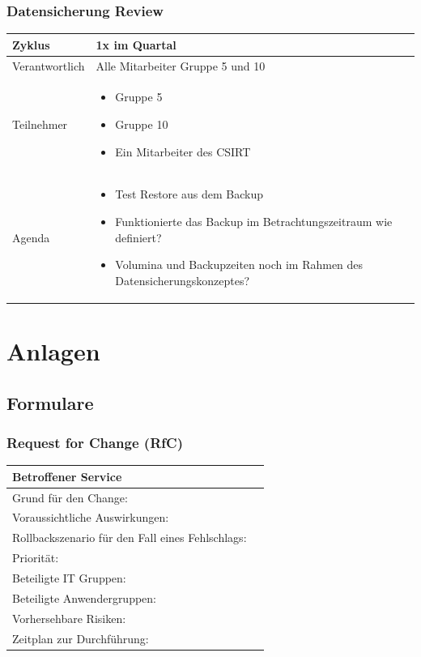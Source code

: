\documentclass[]{article}
\begin{document}
\subsubsection{Datensicherung Review}\label{datensicherung-review}

\begin{longtable}{lp{8cm}}
\toprule
Zyklus & 1x im Quartal\tabularnewline
\midrule
\endhead
Verantwortlich & Alle Mitarbeiter Gruppe 5 und 10\tabularnewline
Teilnehmer & \begin{itemize}
\item
  Gruppe 5
\item
  Gruppe 10
\item
  Ein Mitarbeiter des CSIRT
\end{itemize}\tabularnewline
Agenda & \begin{itemize}
\item
  Test Restore aus dem Backup
\item
  Funktionierte das Backup im Betrachtungszeitraum wie definiert?
\item
  Volumina und Backupzeiten noch im Rahmen des Datensicherungskonzeptes?
\end{itemize}\tabularnewline
\bottomrule
\end{longtable}

\protect\hypertarget{ux5fToc457467708}{}{}
\newpage
\section{Anlagen}\label{anlagen}

\subsection{Formulare}\label{formulare}

\subsubsection{Request for Change (RfC)}\label{request-for-change-rfc}

\begin{longtable}{p{5.5cm}p{7.5cm}}
\toprule
Betroffener Service &\tabularnewline
\midrule
Grund für den Change: & \tabularnewline
Voraussichtliche Auswirkungen: &\tabularnewline
Rollbackszenario für den Fall eines Fehlschlags: &\tabularnewline
Priorität: &\tabularnewline
Beteiligte IT Gruppen: &\tabularnewline
Beteiligte Anwendergruppen: &\tabularnewline
Vorhersehbare Risiken: &\tabularnewline
Zeitplan zur Durchführung: &\tabularnewline
\bottomrule
\end{longtable}
\end{document}
